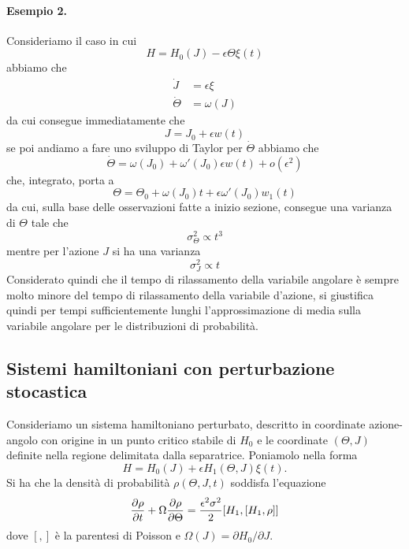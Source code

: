 \documentclass[10pt,a4paper]{article}
\begin{document}
\paragraph{Esempio 2.}
Consideriamo il caso in cui
\begin{equation}
	H = H_0(J) - \epsilon \Theta \xi(t)
\end{equation}
abbiamo che
\begin{align}
	\dot{J} &= \epsilon\xi \\
	\dot{\Theta} &= \omega(J)
\end{align}
da cui consegue immediatamente che
\begin{equation}
	J = J_0 + \epsilon w(t)
\end{equation}
se poi andiamo a fare uno sviluppo di Taylor per $\dot{\Theta}$ abbiamo che
\begin{equation}
	\dot{\Theta} = \omega(J_0) + \omega'(J_0)\epsilon w(t) + o(\epsilon^2)
\end{equation}
che, integrato, porta a
\begin{equation}
	\Theta = \Theta_0 + \omega(J_0)t + \epsilon \omega'(J_0) w_1(t)
\end{equation}
da cui, sulla base delle osservazioni fatte a inizio sezione, consegue una varianza di $\Theta$ tale che
\begin{equation}
	\sigma_{\Theta}^2 \propto t^3
\end{equation}
mentre per l'azione $J$ si ha una varianza
\begin{equation}
	\sigma_{J}^2 \propto t
\end{equation}
Considerato quindi che il tempo di rilassamento della variabile angolare è sempre molto minore del tempo di rilassamento della variabile d'azione, si giustifica quindi per tempi sufficientemente lunghi l'approssimazione di media sulla variabile angolare per le distribuzioni di probabilità.


\subsection{Sistemi hamiltoniani con perturbazione stocastica}
\label{sec:hamiltoniana_stocastica}
Consideriamo un sistema hamiltoniano perturbato, descritto in coordinate azione-angolo con origine in un punto critico stabile di $H_0$ e le coordinate $(\Theta, J)$ definite nella regione delimitata dalla separatrice. Poniamolo nella forma
\begin{equation}
	H = H_0(J) + \epsilon H_1(\Theta, J)\xi(t).
\end{equation}
Si ha che la densità di probabilità $\rho(\Theta, J, t)$ soddisfa l'equazione
\begin{equation}
	\pdv{\rho}{t} + \Omega \pdv{\rho}{\Theta} = \frac{\epsilon^2 \sigma^2}{2}[H_1, [H_1,\rho]] 
\end{equation}
dove $[,]$ è la parentesi di Poisson e $\Omega(J) = \partial H_0/\partial J$.
\end{document}

